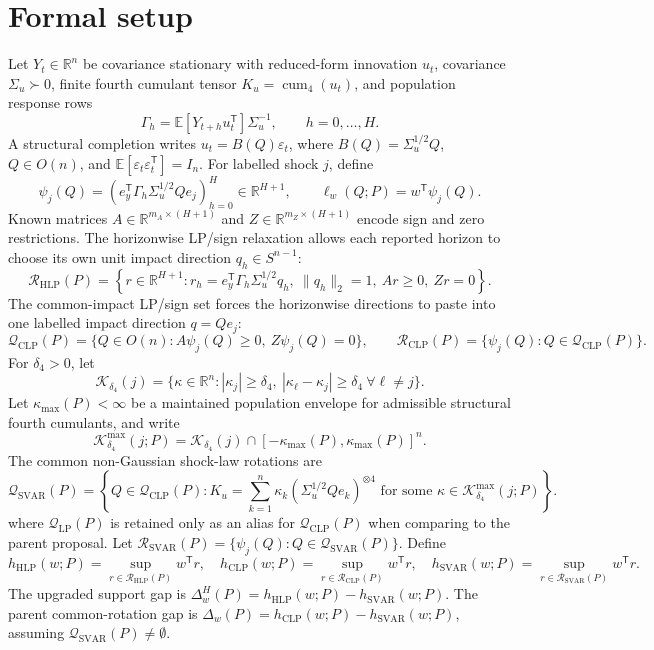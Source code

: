 \documentclass[11pt]{article}
\newcommand{\E}{\mathbb{E}}
\newcommand{\transpose}{\mathsf{T}}
\newcommand{\R}{\mathbb{R}}
\theoremstyle{definition}
\theoremstyle{plain}
\theoremstyle{remark}
\begin{document}
\section{Formal setup}
Let \(Y_t\in\R^n\) be covariance stationary with reduced-form innovation \(u_t\), covariance \(\Sigma_u\succ0\), finite fourth cumulant tensor \(K_u=\operatorname{cum}_4(u_t)\), and population response rows
\[
\Gamma_h=\E[Y_{t+h}u_t^\transpose]\Sigma_u^{-1},\qquad h=0,\ldots,H.
\]
A structural completion writes \(u_t=B(Q)\varepsilon_t\), where \(B(Q)=\Sigma_u^{1/2}Q\), \(Q\in O(n)\), and \(\E[\varepsilon_t\varepsilon_t^\transpose]=I_n\).  For labelled shock \(j\), define
\[
\psi_j(Q)=(e_y^\transpose\Gamma_h\Sigma_u^{1/2}Qe_j)_{h=0}^H\in\R^{H+1},
\qquad \ell_w(Q;P)=w^\transpose\psi_j(Q).
\]
Known matrices \(A\in\R^{m_A\times(H+1)}\) and \(Z\in\R^{m_Z\times(H+1)}\) encode sign and zero restrictions.  The horizonwise LP/sign relaxation allows each reported horizon to choose its own unit impact direction \(q_h\in S^{n-1}\):
\[
\mathcal R_{\mathrm{HLP}}(P)=
\left\{r\in\R^{H+1}:r_h=e_y^\transpose\Gamma_h\Sigma_u^{1/2}q_h,\ 
\|q_h\|_2=1,\ Ar\ge0,\ Zr=0\right\}.
\]
The common-impact LP/sign set forces the horizonwise directions to paste into one labelled impact direction \(q=Qe_j\):
\[
\mathcal Q_{\mathrm{CLP}}(P)=\{Q\in O(n):A\psi_j(Q)\ge0,\ Z\psi_j(Q)=0\},
\qquad
\mathcal R_{\mathrm{CLP}}(P)=\{\psi_j(Q):Q\in\mathcal Q_{\mathrm{CLP}}(P)\}.
\]
For \(\delta_4>0\), let
\[
\mathcal K_{\delta_4}(j)=\{\kappa\in\R^n: |\kappa_j|\ge\delta_4,\ |\kappa_\ell-\kappa_j|\ge\delta_4\ \forall \ell\ne j\}.
\]
Let \(\kappa_{\max}(P)<\infty\) be a maintained population envelope for admissible structural fourth cumulants, and write
\[
\mathcal K_{\delta_4}^{\max}(j;P)=\mathcal K_{\delta_4}(j)\cap[-\kappa_{\max}(P),\kappa_{\max}(P)]^n.
\]
The common non-Gaussian shock-law rotations are
\[
\mathcal Q_{\mathrm{SVAR}}(P)=\left\{Q\in\mathcal Q_{\mathrm{CLP}}(P):
K_u=\sum_{k=1}^n\kappa_k(\Sigma_u^{1/2}Qe_k)^{\otimes4}
\text{ for some }\kappa\in\mathcal K_{\delta_4}^{\max}(j;P)\right\}.
\]
where \(\mathcal Q_{\mathrm{LP}}(P)\) is retained only as an alias for \(\mathcal Q_{\mathrm{CLP}}(P)\) when comparing to the parent proposal.  Let \(\mathcal R_{\mathrm{SVAR}}(P)=\{\psi_j(Q):Q\in\mathcal Q_{\mathrm{SVAR}}(P)\}\).  Define
\[
h_{\mathrm{HLP}}(w;P)=\sup_{r\in\mathcal R_{\mathrm{HLP}}(P)}w^\transpose r,\quad
h_{\mathrm{CLP}}(w;P)=\sup_{r\in\mathcal R_{\mathrm{CLP}}(P)}w^\transpose r,\quad
h_{\mathrm{SVAR}}(w;P)=\sup_{r\in\mathcal R_{\mathrm{SVAR}}(P)}w^\transpose r.
\]
The upgraded support gap is \(\Delta_w^H(P)=h_{\mathrm{HLP}}(w;P)-h_{\mathrm{SVAR}}(w;P)\).  The parent common-rotation gap is \(\Delta_w(P)=h_{\mathrm{CLP}}(w;P)-h_{\mathrm{SVAR}}(w;P)\), assuming \(\mathcal Q_{\mathrm{SVAR}}(P)\ne\emptyset\).
\end{document}
